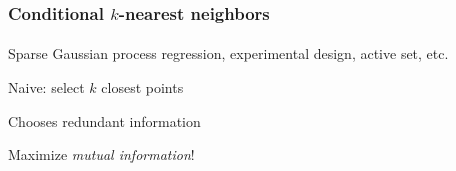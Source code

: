 \documentclass{beamer}                             %
\newenvironment{wideitemize}
  {\itemize\setlength{\itemsep}{0.5cm}}
  {\enditemize}
\begin{document}
\begin{frame}
\frametitle{Conditional \( k \)-nearest neighbors}
\framesubtitle{}

\setlength{\leftmargini}{0em}

\begin{minipage}[c][][c]{0.6\textwidth}
  \begin{wideitemize}
    \item<1-> Sparse Gaussian process regression,
      experimental design, active set, etc.
    \item<1-> Naive: select \( k \) closest points
    \item<2-> Chooses redundant information
    \item<3-> Maximize \emph{mutual information}!
  \end{wideitemize}
\end{minipage}%
\hfill
\begin{minipage}[c][][t]{0.4\textwidth}
  \begin{figure}[t!]
    \centering
     {}
  \end{figure}
  \vspace{-5\baselineskip}
   {
    \begin{figure}
      \centering
    \end{figure}
  }
\end{minipage}
\end{frame}
\end{document}
